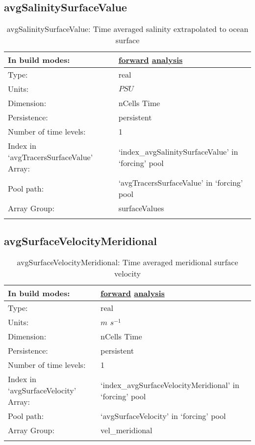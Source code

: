 \subsection[avgSalinitySurfaceValue]{avgSalinitySurfaceValue}
\label{subsec:var_sec_forcing_avgSalinitySurfaceValue}
\begin{center}
\begin{longtable}{| p{2.0in} | p{4.0in} |}
        \hline 
        In build modes: & \hyperref[subsec:forward_var_tab_forcing]{forward} \hyperref[subsec:analysis_var_tab_forcing]{analysis} \\
        \hline 
        Type: & real \\
        \hline 
        Units: & $PSU$ \\
        \hline 
        Dimension: & nCells Time \\
        \hline 
        Persistence: & persistent \\
        \hline 
        Number of time levels: & 1 \\
        \hline 
		 Index in `avgTracersSurfaceValue' Array: & `index\_avgSalinitySurfaceValue' in `forcing' pool \\
		 \hline 
            Pool path: & `avgTracersSurfaceValue' in `forcing' pool \\
		 \hline 
		 Array Group: & surfaceValues \\
		 \hline 
    \caption{avgSalinitySurfaceValue: Time averaged salinity extrapolated to ocean surface}
\end{longtable}
\end{center}
\subsection[avgSurfaceVelocityMeridional]{avgSurfaceVelocityMeridional}
\label{subsec:var_sec_forcing_avgSurfaceVelocityMeridional}
\begin{center}
\begin{longtable}{| p{2.0in} | p{4.0in} |}
        \hline 
        In build modes: & \hyperref[subsec:forward_var_tab_forcing]{forward} \hyperref[subsec:analysis_var_tab_forcing]{analysis} \\
        \hline 
        Type: & real \\
        \hline 
        Units: & $m$ $s^{-1}$ \\
        \hline 
        Dimension: & nCells Time \\
        \hline 
        Persistence: & persistent \\
        \hline 
        Number of time levels: & 1 \\
        \hline 
		 Index in `avgSurfaceVelocity' Array: & `index\_avgSurfaceVelocityMeridional' in `forcing' pool \\
		 \hline 
            Pool path: & `avgSurfaceVelocity' in `forcing' pool \\
		 \hline 
		 Array Group: & vel\_meridional \\
		 \hline 
    \caption{avgSurfaceVelocityMeridional: Time averaged meridional surface velocity}
\end{longtable}
\end{center}
